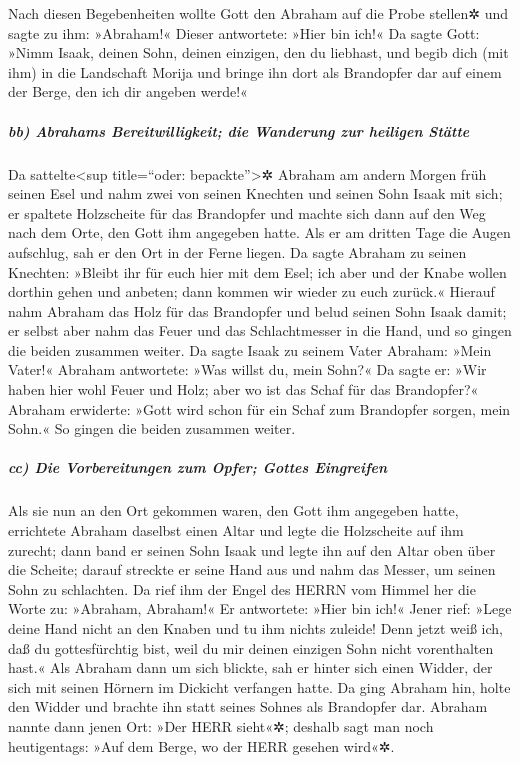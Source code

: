  Nach diesen Begebenheiten wollte Gott den Abraham auf die
Probe stellen✲ und sagte zu ihm: »Abraham!« Dieser antwortete: »Hier bin
ich!«  Da sagte Gott: »Nimm Isaak, deinen Sohn, deinen
einzigen, den du liebhast, und begib dich (mit ihm) in die Landschaft
Morija und bringe ihn dort als Brandopfer dar auf einem der Berge, den
ich dir angeben werde!«

\hypertarget{bb-abrahams-bereitwilligkeit-die-wanderung-zur-heiligen-stuxe4tte}{%
\subparagraph{bb) Abrahams Bereitwilligkeit; die Wanderung zur heiligen
Stätte}\label{bb-abrahams-bereitwilligkeit-die-wanderung-zur-heiligen-stuxe4tte}}

 Da sattelte\textless sup title=``oder:
bepackte''\textgreater✲ Abraham am andern Morgen früh seinen Esel und
nahm zwei von seinen Knechten und seinen Sohn Isaak mit sich; er
spaltete Holzscheite für das Brandopfer und machte sich dann auf den Weg
nach dem Orte, den Gott ihm angegeben hatte.  Als er am
dritten Tage die Augen aufschlug, sah er den Ort in der Ferne liegen.
 Da sagte Abraham zu seinen Knechten: »Bleibt ihr für euch
hier mit dem Esel; ich aber und der Knabe wollen dorthin gehen und
anbeten; dann kommen wir wieder zu euch zurück.«  Hierauf
nahm Abraham das Holz für das Brandopfer und belud seinen Sohn Isaak
damit; er selbst aber nahm das Feuer und das Schlachtmesser in die Hand,
und so gingen die beiden zusammen weiter.  Da sagte Isaak
zu seinem Vater Abraham: »Mein Vater!« Abraham antwortete: »Was willst
du, mein Sohn?« Da sagte er: »Wir haben hier wohl Feuer und Holz; aber
wo ist das Schaf für das Brandopfer?«  Abraham erwiderte:
»Gott wird schon für ein Schaf zum Brandopfer sorgen, mein Sohn.« So
gingen die beiden zusammen weiter.

\hypertarget{cc-die-vorbereitungen-zum-opfer-gottes-eingreifen}{%
\subparagraph{cc) Die Vorbereitungen zum Opfer; Gottes
Eingreifen}\label{cc-die-vorbereitungen-zum-opfer-gottes-eingreifen}}

 Als sie nun an den Ort gekommen waren, den Gott ihm
angegeben hatte, errichtete Abraham daselbst einen Altar und legte die
Holzscheite auf ihm zurecht; dann band er seinen Sohn Isaak und legte
ihn auf den Altar oben über die Scheite;  darauf streckte
er seine Hand aus und nahm das Messer, um seinen Sohn zu schlachten.
 Da rief ihm der Engel des HERRN vom Himmel her die Worte
zu: »Abraham, Abraham!« Er antwortete: »Hier bin ich!« 
Jener rief: »Lege deine Hand nicht an den Knaben und tu ihm nichts
zuleide! Denn jetzt weiß ich, daß du gottesfürchtig bist, weil du mir
deinen einzigen Sohn nicht vorenthalten hast.«  Als
Abraham dann um sich blickte, sah er hinter sich einen Widder, der sich
mit seinen Hörnern im Dickicht verfangen hatte. Da ging Abraham hin,
holte den Widder und brachte ihn statt seines Sohnes als Brandopfer dar.
 Abraham nannte dann jenen Ort: »Der HERR sieht«✲;
deshalb sagt man noch heutigentags: »Auf dem Berge, wo der HERR gesehen
wird«✲.


